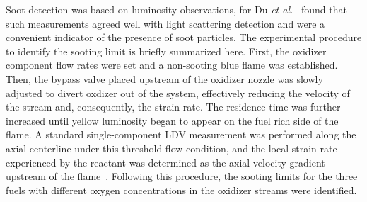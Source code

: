 \documentclass[review,3p,times]{elsarticleUS}
\begin{document}

Soot detection was based on luminosity observations, for Du \emph{et al.}~\cite{du89} found that such measurements agreed well with light scattering detection and were a convenient indicator of the presence of soot particles. The experimental procedure to identify the sooting limit is briefly summarized here. First, the oxidizer component flow rates were set and a non-sooting blue flame was established. Then, the bypass valve placed upstream of the oxidizer nozzle was slowly adjusted to divert oxdizer out of the system, effectively reducing the velocity of the stream and, consequently, the strain rate. The residence time was further increased until yellow luminosity began to appear on the fuel rich side of the flame. A standard single-component LDV measurement was performed along the axial centerline under this threshold flow condition, and the local strain rate experienced by the reactant was determined as the axial velocity gradient upstream of the flame~\cite{du89}. Following this procedure, the sooting limits for the three fuels with different oxygen concentrations in the oxidizer streams were identified.
\end{document}
